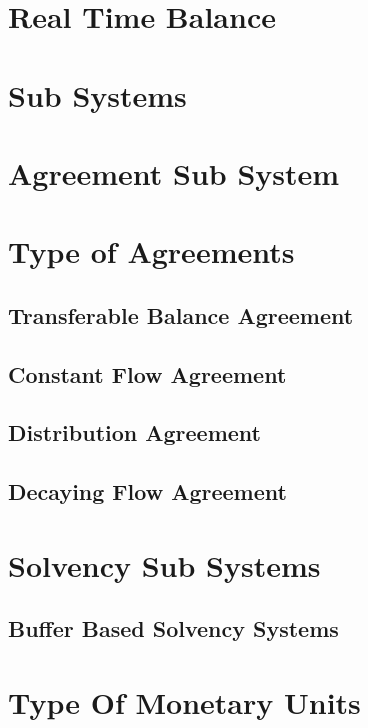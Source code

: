 \documentclass[a4paper,10pt]{report}
\begin{document}
\section{Real Time Balance}

\section{Sub Systems}

\section{Agreement Sub System}

\section{Type of Agreements}

\subsection{Transferable Balance Agreement}

\subsection{Constant Flow Agreement}

\subsection{Distribution Agreement}

\subsection{Decaying Flow Agreement}

\section{Solvency Sub Systems}

\subsection{Buffer Based Solvency Systems}

\section{Type Of Monetary Units}

\end{document}

